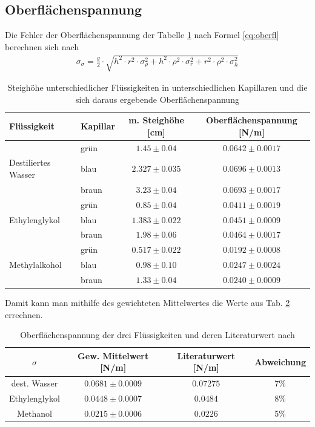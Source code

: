 \documentclass[12pt,a4paper,titlepage,headinclude,bibtotoc]{scrartcl}
\begin{document}
\subsection{Oberflächenspannung}
Die Fehler der Oberflächenspannung der Tabelle \ref{tab:ober} nach Formel \eqref{eq:oberfl} berechnen sich nach
\begin{align*}
\sigma_{\sigma}=\frac{g}{2} \cdot \sqrt{h^{2} \cdot r^{2} \cdot \sigma_{\rho}^{2} + h^{2} \cdot \rho^{2} \cdot \sigma_{r}^{2} + r^{2} \cdot \rho^{2} \cdot \sigma_{h}^{2}}
\end{align*}
\begin{table}[!h]
\centering
\begin{tabular}{|l|l|c|c|}
\hline
Flüssigkeit 	     &Kapillar 	& m. Steighöhe [cm]		& Oberflächenspannung [N/m]\\\hline\hline
				&grün	& $1.45\pm 0.04$	&$ 0.0642 \pm 0.0017 $\\
Destiliertes Wasser		&blau	& $2.327\pm 0.035$	&$ 0.0696 \pm 0.0013 $\\
            			&braun	& $3.23\pm 0.04$	&$ 0.0693 \pm 0.0017 $\\\hline
				&grün	& $0.85\pm 0.04$	&$ 0.0411 \pm 0.0019 $\\
Ethylenglykol			&blau	& $1.383\pm 0.022$	&$ 0.0451 \pm 0.0009 $\\
				&braun	& $1.98\pm 0.06$	&$ 0.0464 \pm 0.0017 $\\\hline
				&grün	& $0.517\pm 0.022$	&$ 0.0192 \pm 0.0008 $\\
Methylalkohol			&blau	& $0.98\pm 0.10$	&$ 0.0247 \pm 0.0024 $\\
				&braun	& $1.33\pm 0.04$	&$ 0.0240 \pm 0.0009 $\\
\hline
\end{tabular}
\caption{Steighöhe unterschiedlicher Flüssigkeiten in unterschiedlichen Kapillaren und die sich daraus ergebende Oberflächenspannung\label{tab:ober}}
\end{table}
Damit kann man mithilfe des gewichteten Mittelwertes die Werte aus Tab. \ref{tab:sigma} errechnen.\\
\begin{table}[!h]
\centering
\begin{tabular}{|c||c|c|c|}
\hline
$\sigma$ 		& Gew. Mittelwert [\si{\newton/\meter}]	& Literaturwert [\si{\newton/\meter}]	& Abweichung\\\hline\hline
dest. Wasser 		& $ 0.0681 \pm 0.0009 $			&$0.07275$				&7\%	\\\hline 
Ethylenglykol 		& $ 0.0448 \pm 0.0007 $			&$0.0484$				&8\%	\\\hline 
Methanol		& $ 0.0215 \pm 0.0006 $			&$0.0226$				&5\%	\\ 
\hline 
\end{tabular} 
\caption{Oberflächenspannung der drei Flüssigkeiten und deren Literaturwert nach \protect\footnotemark\label{tab:sigma}}
\end{table}
\end{document}
